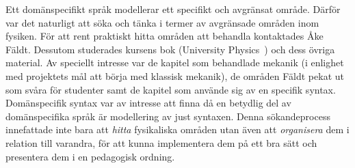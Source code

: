 Ett domänspecifikt språk modellerar ett specifikt och avgränsat område. Därför
var det naturligt att söka och tänka i termer av avgränsade områden inom
fysiken.
För att rent praktiskt hitta områden att behandla kontaktades Åke
Fäldt. Dessutom studerades kursens bok (University
Physics~\cite{UP}) och dess övriga material. Av speciellt intresse
var de kapitel som behandlade mekanik (i enlighet med projektets mål att börja
med klassisk mekanik), de områden Fäldt pekat ut som svåra för studenter samt de kapitel som använde sig av en
specifik syntax. Domänspecifik syntax var av intresse att finna
då en betydlig del av domänspecifika språk är modellering av just syntaxen. Denna sökandeprocess innefattade inte bara att \textit{hitta} fysikaliska
områden utan även att \textit{organisera} dem i relation till varandra, för att kunna implementera dem på ett bra sätt och presentera dem i en pedagogisk ordning.

%
%


